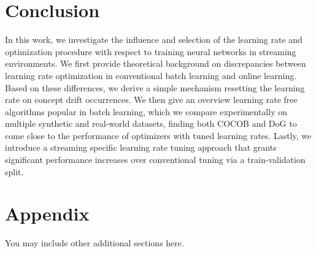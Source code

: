 \documentclass{article} %
\begin{document}
\section{Conclusion}

In this work, we investigate the influence and selection of the learning rate and optimization procedure with respect to training neural networks in streaming environments.
We first provide theoretical background on discrepancies between learning rate optimization in conventional batch learning and online learning.
Based on these differences, we derive a simple mechanism resetting the learning rate on concept drift occurrences.
We then give an overview learning rate free algorithms popular in batch learning, which we compare experimentally on multiple synthetic and real-world datasets,
finding both COCOB and DoG to come close to the performance of optimizers with tuned learning rates.
Lastly, we introduce a streaming specific learning rate tuning approach that grants significant performance increases over conventional tuning via a train-validation split.




\appendix
\section{Appendix}
You may include other additional sections here.
\end{document}
